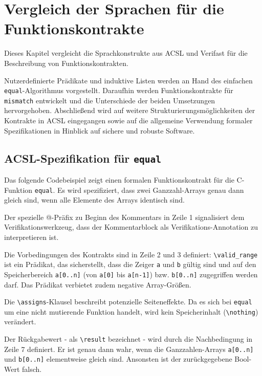 ﻿\chapter{Vergleich der Sprachen für die Funktionskontrakte}
\label{sec:design-by-contract}

Dieses Kapitel vergleicht die Sprachkonstrukte aus ACSL und Verifast für die Beschreibung von Funktionskontrakten.

Nutzerdefinierte Prädikate und induktive Listen werden an Hand des einfachen \texttt{equal}-Algorithmus vorgestellt.
Daraufhin werden Funktionskontrakte für \texttt{mismatch} entwickelt und die Unterschiede der beiden Umsetzungen
hervorgehoben. Abschließend wird auf weitere Strukturierungsmöglichkeiten der Kontrakte in ACSL eingegangen sowie 
auf die allgemeine Verwendung formaler Spezifikationen in Hinblick auf sichere und robuste Software.


\section{ACSL-Spezifikation für \texttt{equal}}
\label{sec:design-by-contract:acsl-spezifikation}

Das folgende Codebeispiel zeigt einen formalen Funktionskontrakt für die C-Funktion \texttt{equal}. Es wird
spezifiziert, dass zwei Ganzzahl-Arrays genau dann gleich sind, wenn alle Elemente des Arrays identisch sind.



Der spezielle @-Präfix zu Beginn des Kommentars in Zeile 1 signalisiert dem Verifikationswerkzeug, 
dass der Kommentarblock als Verifikations-Annotation zu interpretieren ist. 

Die Vorbedingungen des Kontrakts sind in Zeile 2 und 3 definiert: \lstinline{\valid_range} ist ein Prädikat, das sicherstellt,
dass die Zeiger \lstinline{a} und \lstinline{b} gültig sind und auf den Speicherbereich \lstinline{a[0..n]} 
(von \lstinline{a[0]} bis \lstinline{a[n-1]}) bzw. \lstinline{b[0..n]} zugegriffen 
werden darf. Das Prädikat verbietet zudem negative Array-Größen.

Die \lstinline{\assigns}-Klausel beschreibt potenzielle Seiteneffekte. Da es sich bei \texttt{equal} um eine nicht mutierende
Funktion handelt, wird kein Speicherinhalt (\lstinline{\nothing}) verändert.

Der Rückgabewert - als \lstinline{\result} bezeichnet - wird durch die Nachbedingung in Zeile 7 definiert. Er ist genau dann
wahr, wenn die Ganzzahlen-Arrays \lstinline{a[0..n]} und \lstinline{b[0..n]} elementweise gleich sind. Ansonsten ist der 
zurückgegebene Bool-Wert falsch. 


